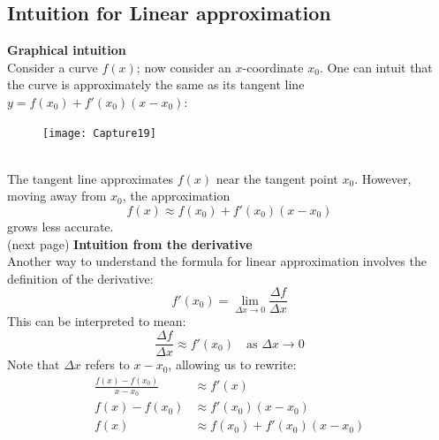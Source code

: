 \documentclass{report}
\begin{document}
\subsection{Intuition for Linear approximation} %
\textbf{Graphical intuition}\\
Consider a curve $f(x)$; now consider an $x$-coordinate $x_0$. One can intuit 
that the curve is approximately the same as its tangent line 
$y=f(x_0)+f'(x_0)(x-x_0)$:
\begin{figure}[h]
\texttt{[image: Capture19]}\\
\centering
{}
\end{figure}\\
The tangent line approximates $f(x)$ near the tangent point $x_0$. However, moving
away from $x_0$, the approximation
\begin{equation*}
f(x)\approx f(x_0)+f'(x_0)(x-x_0)
\end{equation*}
grows less accurate.\\
(next page)
\newpage
\noindent\textbf{Intuition from the derivative}\\
Another way to understand the formula for linear approximation involves
the definition of the derivative:
\begin{equation*}
f'(x_0)=\lim_{\Delta x\to0}\frac{\Delta f}{\Delta x}
\end{equation*}
This can be interpreted to mean:
\begin{equation*}
\frac{\Delta f}{\Delta x}\approx f'(x_0)\quad\text{as $\Delta x\to0$}
\end{equation*}
Note that $\Delta x$ refers to $x-x_0$, allowing us to rewrite:
\begin{align*}
\frac{f(x)-f(x_0)}{x-x_0}&\approx f'(x)\\
f(x)-f(x_0)&\approx f'(x_0)(x-x_0)\\
f(x)&\approx f(x_0)+f'(x_0)(x-x_0)
\end{align*}
\newpage
\end{document}
